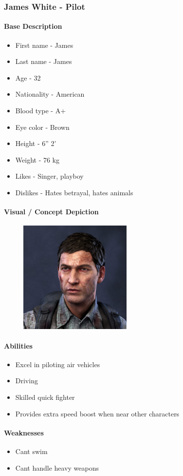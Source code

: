 \subsubsection{\Large James White - Pilot}
	\paragraph{\Large Base Description}\mbox{}
		\begin{itemize}
			\item First name - James
			\item Last name - James
			\item Age - 32
			\item Nationality - American
			\item Blood type - A+
			\item Eye color - Brown
			\item Height - 6” 2’
			\item Weight - 76 kg
			\item Likes - Singer, playboy
			\item Dislikes - Hates betrayal, hates animals
		\end{itemize}
	\paragraph{\Large Visual / Concept Depiction}\mbox{}
		\begin{figure}[H]
			\centering
			\includegraphics[width=0.5\textwidth]{images/characters/james}
		\end{figure}
	\paragraph{\Large Abilities}\mbox{}
		\begin{itemize}
			\item Excel in piloting air vehicles
			\item Driving 
			\item Skilled quick fighter
			\item Provides extra speed boost when near other characters
		\end{itemize}
	\paragraph{\Large Weaknesses}\mbox{}
		\begin{itemize}
			\item Can\textquotesingle t swim
			\item Can\textquotesingle t handle heavy weapons
		\end{itemize}